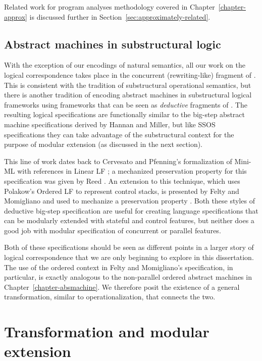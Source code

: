 Related work for program analyses methodology covered in 
Chapter~\ref{chapter-approx} is
discussed further in Section~\ref{sec:approximately-related}.

\subsection*{Abstract machines in substructural logic}

With the exception of our encodings of natural semantics, all our
work on the logical correspondence takes place in the concurrent
(rewriting-like) fragment of \sls. This is consistent with the
tradition of substructural operational semantics, but there is another
tradition of encoding abstract machines in substructural logical
frameworks using frameworks that can be seen as {\it deductive}
fragments of \sls. The resulting logical specifications are
functionally similar to the big-step abstract machine specifications
derived by Hannan and Miller, but like SSOS specifications they can
take advantage of the substructural context for the purpose of modular
extension (as discussed in the next section).

This line of work dates back to Cervesato and Pfenning's formalization
of Mini-ML with references in Linear LF \cite{cervesato02linear}; a
mechanized preservation property for this specification was given by
Reed \cite{reed09hybrid}. An extension to this technique, which uses
Polakow's Ordered LF to represent control stacks, is presented by
Felty and Momigliano and used to mechanize a preservation property
\cite{felty12hybrid}. Both these styles of deductive big-step
specification are useful for creating language specifications that can
be modularly extended with stateful and control features, but neither
does a good job with modular specification of concurrent or parallel
features.

Both of these specifications should be seen as different points in a
larger story of logical correspondence that we are only beginning to
explore in this dissertation. The use of the ordered context in Felty and
Momigliano's specification, in particular, is exactly analogous to the
non-parallel ordered abstract machines in
Chapter~\ref{chapter-absmachine}. We therefore posit the existence of
a general transformation, similar to operationalization, that connects
the two.

\section{Transformation and modular extension}
\label{sec:the-point-is-modular-extension}

